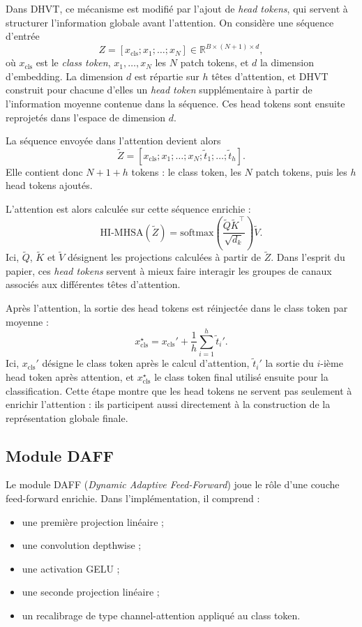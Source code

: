\documentclass[11pt,a4paper]{article}
\begin{document}
Dans DHVT, ce m\'ecanisme est modifi\'e par l'ajout de \textit{head tokens}, qui servent \`a structurer l'information globale avant l'attention. On consid\`ere une s\'equence d'entr\'ee
\[
Z = [x_{\text{cls}}; x_1; \dots; x_N] \in \mathbb{R}^{B \times (N+1) \times d},
\]
o\`u $x_{\text{cls}}$ est le \textit{class token}, $x_1,\dots,x_N$ les $N$ patch tokens, et $d$ la dimension d'embedding. La dimension $d$ est r\'epartie sur $h$ t\^etes d'attention, et DHVT construit pour chacune d'elles un \textit{head token} suppl\'ementaire \`a partir de l'information moyenne contenue dans la s\'equence. Ces head tokens sont ensuite reprojet\'es dans l'espace de dimension $d$.

La s\'equence envoy\'ee dans l'attention devient alors
\[
\tilde{Z} = [x_{\text{cls}}; x_1; \dots; x_N; \tilde{t}_1; \dots; \tilde{t}_h].
\]
Elle contient donc $N+1+h$ tokens : le class token, les $N$ patch tokens, puis les $h$ head tokens ajout\'es.

L'attention est alors calcul\'ee sur cette s\'equence enrichie :
\[
\mathrm{HI\text{-}MHSA}(\tilde{Z})=
\mathrm{softmax}\left(\frac{\tilde{Q}\tilde{K}^\top}{\sqrt{d_k}}\right)\tilde{V}.
\]
Ici, $\tilde{Q}$, $\tilde{K}$ et $\tilde{V}$ d\'esignent les projections calcul\'ees \`a partir de $\tilde{Z}$. Dans l'esprit du papier, ces \textit{head tokens} servent \`a mieux faire interagir les groupes de canaux associ\'es aux diff\'erentes t\^etes d'attention.

Apr\`es l'attention, la sortie des head tokens est r\'einject\'ee dans le class token par moyenne :
\[
x_{\text{cls}}^{\star} = x_{\text{cls}}' + \frac{1}{h}\sum_{i=1}^{h} \tilde{t}_i'.
\]
Ici, $x_{\text{cls}}'$ d\'esigne le class token apr\`es le calcul d'attention, $\tilde{t}_i'$ la sortie du $i$-i\`eme head token apr\`es attention, et $x_{\text{cls}}^{\star}$ le class token final utilis\'e ensuite pour la classification. Cette \'etape montre que les head tokens ne servent pas seulement \`a enrichir l'attention : ils participent aussi directement \`a la construction de la repr\'esentation globale finale.

\subsection{Module DAFF}
\label{subsec:daff}
Le module DAFF (\textit{Dynamic Adaptive Feed-Forward}) joue le r\^ole d'une couche feed-forward enrichie. Dans l'impl\'ementation, il comprend :
\begin{itemize}[leftmargin=1.2cm]
    \item une premi\`ere projection lin\'eaire ;
    \item une convolution depthwise ;
    \item une activation GELU ;
    \item une seconde projection lin\'eaire ;
    \item un recalibrage de type channel-attention appliqu\'e au class token.
\end{itemize}
\end{document}
